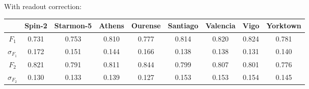 With readout correction:
\begin{table}[H]
    \centering
    \begin{tabular}{|c|c|c|c|c|c|c|c|c|}
    \hline
    \textbf{} & \textbf{Spin-2} & \textbf{Starmon-5} & \textbf{Athens} & \textbf{Ourense} & \textbf{Santiago} & \textbf{Valencia} & \textbf{Vigo} & \textbf{Yorktown} \\ \hline
    $F_1$              & 0.731 & 0.753 & 0.810 & 0.777 & 0.814 & 0.820 & 0.824 & 0.781 \\ \hline
    $\sigma_{F_1}$     & 0.172 & 0.151 & 0.144 & 0.166 & 0.138 & 0.138 & 0.131 & 0.140 \\ \hline
    $F_2$              & 0.821 & 0.791 & 0.811 & 0.844 & 0.799 & 0.807 & 0.801 & 0.776 \\ \hline
    $\sigma_{F_2}$     & 0.130 & 0.133 & 0.139 & 0.127 & 0.153 & 0.153 & 0.154 & 0.145 \\ \hline
    \end{tabular}
\end{table}
\iffalse
